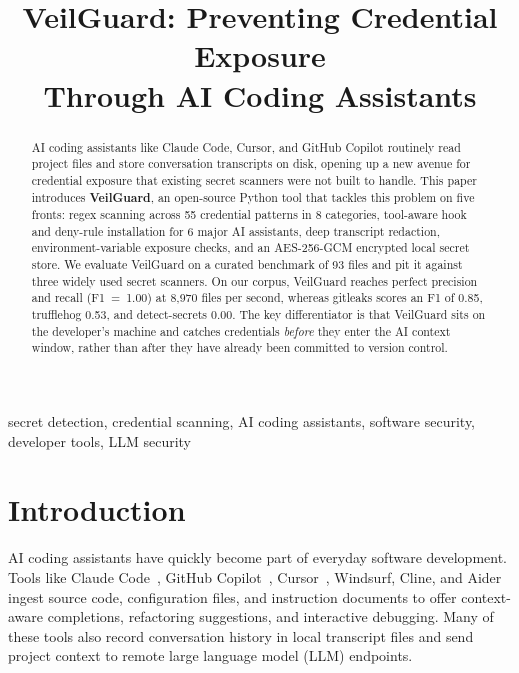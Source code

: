 \documentclass[conference]{IEEEtran}
\begin{document}
\title{VeilGuard: Preventing Credential Exposure\\Through AI Coding Assistants}

\author{
}

\maketitle

\begin{abstract}
AI coding assistants like Claude Code, Cursor, and GitHub Copilot routinely
read project files and store conversation transcripts on disk, opening up a
new avenue for credential exposure that existing secret scanners were not built
to handle. This paper introduces \textbf{VeilGuard}, an open-source Python
tool that tackles this problem on five fronts: regex scanning across 55
credential patterns in 8 categories, tool-aware hook and deny-rule installation
for 6 major AI assistants, deep transcript redaction, environment-variable
exposure checks, and an AES-256-GCM encrypted local secret store. We evaluate
VeilGuard on a curated benchmark of 93 files and pit it against three
widely used secret scanners. On our corpus, VeilGuard reaches perfect precision
and recall (F1~=~1.00) at 8{,}970 files per second, whereas gitleaks scores an
F1 of 0.85, trufflehog 0.53, and detect-secrets 0.00. The key differentiator
is that VeilGuard sits on the developer's machine and catches credentials
\emph{before} they enter the AI context window, rather than after they have
already been committed to version control.
\end{abstract}

\begin{IEEEkeywords}
secret detection, credential scanning, AI coding assistants, software security,
developer tools, LLM security
\end{IEEEkeywords}

\section{Introduction}
\label{sec:intro}

AI coding assistants have quickly become part of everyday software development.
Tools like Claude Code~\cite{anthropic2024claude}, GitHub
Copilot~\cite{copilot2024}, Cursor~\cite{cursor2024}, Windsurf, Cline, and
Aider ingest source code, configuration files, and instruction documents to
offer context-aware completions, refactoring suggestions, and interactive
debugging. Many of these tools also record conversation history in local
transcript files and send project context to remote large language model (LLM)
endpoints.
\end{document}
